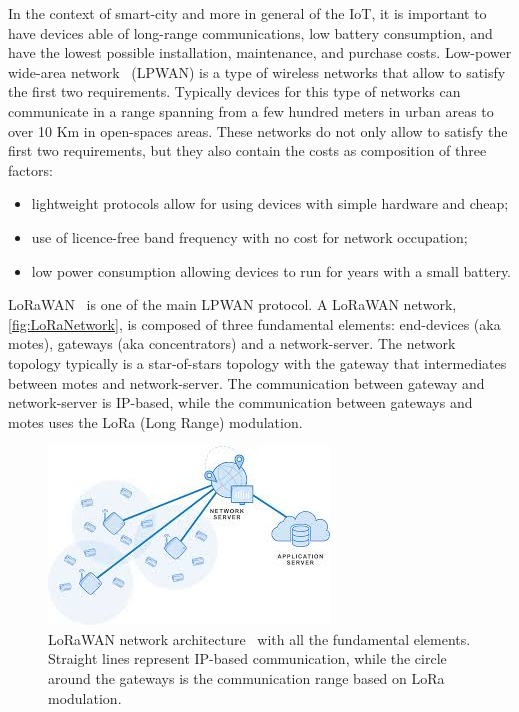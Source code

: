 In the context of smart-city and more in general of the IoT, it is important to have devices able of long-range communications, low battery consumption, and have the lowest possible installation, maintenance, and purchase costs.
Low-power wide-area network~\cite{Raza2017} (LPWAN) is a type of wireless networks that allow to satisfy the first two requirements.
Typically devices for this type of networks can communicate in a range spanning from a few hundred meters in urban areas to over 10 Km in open-spaces areas.
These networks do not only allow to satisfy the first two requirements, but they also contain the costs as composition of three factors:
\begin{itemize}
    \item lightweight protocols allow for using devices with simple hardware and cheap;
    \item use of licence-free band frequency with no cost for network occupation;
    \item low power consumption allowing devices to run for years with a small battery.
\end{itemize}

LoRaWAN~\cite{loraalliancetechnicalcommittee2020} is one of the main LPWAN protocol.
A LoRaWAN network, \autoref{fig:LoRaNetwork}, is composed of three fundamental elements: end-devices (aka motes), gateways (aka concentrators) and a network-server. 
% 
The network topology typically is a star-of-stars topology with the gateway that intermediates between motes and network-server.
% 
The communication between gateway and network-server is IP-based, while the communication between gateways and motes uses the LoRa (Long Range) modulation.

\begin{figure}[h]
    \centering
    \includegraphics{figures/lora_architecture2.png}
    \caption[LoRaWAN network architecture]{LoRaWAN network architecture~\cite{muntasirjoarder2020} with all the fundamental elements. Straight lines represent IP-based communication, while the circle around the gateways is the communication range based on LoRa modulation.}
    \label{fig:LoRaNetwork}
\end{figure}

